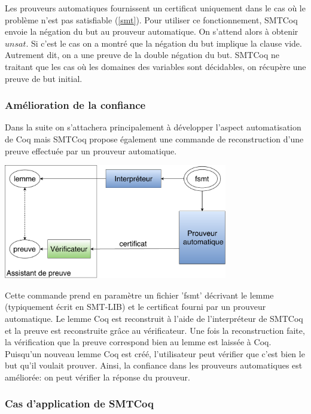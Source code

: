 \documentclass[11pt]{article}
\begin{document}
Les prouveurs automatiques fournissent un certificat uniquement dans le cas où le problème n'est pas satisfiable (\ref{smt}). Pour utiliser ce fonctionnement, SMTCoq envoie la négation du but au prouveur automatique. On s'attend alors à obtenir $unsat$. Si c'est le cas on a montré que la négation du but implique la clause vide. Autrement dit, on a une preuve de la double négation du but. SMTCoq ne traitant que les cas où les domaines des variables sont décidables, on récupère une preuve de but initial.


\subsubsection{Amélioration de la confiance}

Dans la suite on s'attachera principalement à développer l'aspect automatisation de Coq mais SMTCoq propose également une commande de reconstruction d'une preuve effectuée par un prouveur automatique.

\begin{center}
\includegraphics[height=5cm]{Confiance.pdf}
\end{center}

Cette commande prend en paramètre un fichier 'fsmt' décrivant le lemme (typiquement écrit en SMT-LIB) et le certificat fourni par un prouveur automatique. Le lemme Coq est reconstruit à l'aide de l'interpréteur de SMTCoq et la preuve est reconstruite grâce au vérificateur. Une fois la reconstruction faite, la vérification que la preuve correspond bien au lemme est laissée à Coq. \\

Puisqu'un nouveau lemme Coq est créé, l'utilisateur peut vérifier que c'est bien le but qu'il voulait prouver. Ainsi, la confiance dans les prouveurs automatiques est améliorée: on peut vérifier la réponse du prouveur.


\subsubsection{Cas d'application de SMTCoq}
\end{document}

